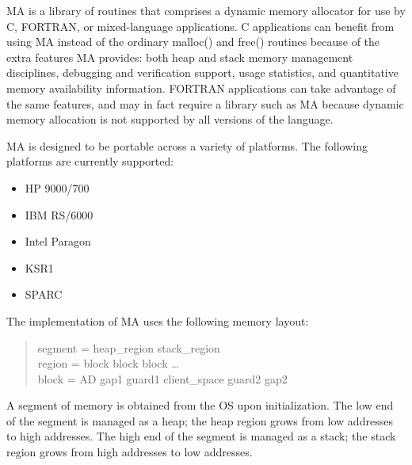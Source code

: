 
\setlength{\topmargin}{0in}
\setlength{\headheight}{0in}
\setlength{\headsep}{0in}
\setlength{\topskip}{0in}
\setlength{\textheight}{8.5in}
\setlength{\footheight}{10pt}
\setlength{\footskip}{0.5in}

\setlength{\textwidth}{6.5in}
\setlength{\oddsidemargin}{0in}
\setlength{\evensidemargin}{0in}
\setlength{\marginparwidth}{0in}
\setlength{\parindent}{0in}



MA is a library of routines that comprises a dynamic memory allocator
for use by C, FORTRAN, or mixed-language applications.  C applications
can benefit from using MA instead of the ordinary malloc() and free()
routines because of the extra features MA provides:  both heap and
stack memory management disciplines, debugging and verification
support, usage statistics, and quantitative memory availability
information.  FORTRAN applications can take advantage of the same
features, and may in fact require a library such as MA because dynamic
memory allocation is not supported by all versions of the language.

MA is designed to be portable across a variety of platforms.
The following platforms are currently supported:

\begin{itemize}
\item HP 9000/700
\item IBM RS/6000
\item Intel Paragon
\item KSR1
\item SPARC
\end{itemize}

The implementation of MA uses the following memory layout:

\begin{quote}
segment = heap\_region stack\_region \\
region = block block block \ldots \\
block = AD gap1 guard1 client\_space guard2 gap2
\end{quote}

A segment of memory is obtained from the OS upon initialization.
The low end of the segment is managed as a heap; the heap region
grows from low addresses to high addresses.  The high end of the
segment is managed as a stack; the stack region grows from high
addresses to low addresses.


